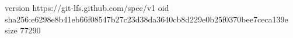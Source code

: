 version https://git-lfs.github.com/spec/v1
oid sha256:e6298e8b41eb66f08547b27c23d38da3640cb8d229e0b25f0370bee7ceca139e
size 77290
